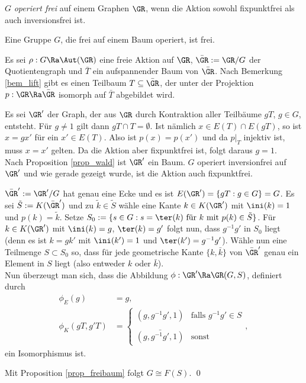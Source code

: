 \DEF $G$ \emph{operiert frei}
auf einem Graphen $\GR$, wenn die Aktion sowohl
fixpunktfrei als auch inversionsfrei ist.

\SATZ\label{satz_frei} Eine Gruppe $G$, die frei auf einem Baum
operiert, ist frei.

\bew Es sei $\rho:G\Ra\Aut(\GR)$ eine freie Aktion auf $\GR$,
$\bar{\GR}:=\GR/G$ der Quotientengraph und $\bar{T}$ ein aufspannender
Baum von $\bar{\GR}$. Nach Bemerkung \ref{bem_lift} gibt es einen
Teilbaum $T\subseteq \bar{\GR}$, der unter der Projektion
$p:\GR\Ra\bar{\GR}$ isomorph auf $\bar{T}$ abgebildet wird.

Es sei $\GR'$ der Graph, der aus $\GR$ durch Kontraktion aller
Teilbäume $gT$, $g\in G$, entsteht.
Für $g\neq 1$ gilt dann $gT\cap T=\emptyset$.
Ist nämlich $x\in E(T)\cap E(gT)$, so ist $x=gx'$ für ein
$x'\in E(T)$. Also ist $p(x)=p(x')$ und da $p|_T$ injektiv ist,
muss $x=x'$ gelten. Da die Aktion aber fixpunktfrei ist, folgt
daraus $g=1$.\\
Nach Proposition \ref{prop_wald} ist $\GR'$ ein Baum. $G$ operiert
inversionfrei auf $\GR'$ und wie gerade gezeigt wurde, ist
die Aktion auch fixpunktfrei.

$\bar{\GR}':=\GR'/G$ hat genau eine Ecke und es ist
$E(\GR')=\{gT:g \in G\}=G$.
Es sei $\tilde{S}:= K(\bar{\GR}')$ und zu $\tilde{k}\in\tilde{S}$
wähle eine Kante $k\in K(\GR')$ mit $\ini(k)=1$ und $p(k)=\tilde{k}$.
Setze
$S_0:=\{s\in G: s=\ter(k)\text{ für $k$ mit $p(k)\in\tilde{S}$}\}$.
Für $k\in K(\GR')$ mit $\ini(k)=g$, $\ter(k)=g'$ folgt nun,
dass $g^{-1}g'$ in $S_0$ liegt (denn es ist $k=gk'$ mit
$\ini(k')=1$ und $\ter(k')=g^{-1}g'$).
Wähle nun eine Teilmenge $S\subset S_0$ so, dass für jede
geometrische Kante $\{k,\bar{k}\}$ von $\bar{\GR}'$ genau
ein Element in $S$ liegt (also entweder $k$ oder $\bar{k}$).\\
Nun überzeugt man sich, dass die Abbildung
$\phi:\GR'\Ra\GR(G,S)$, definiert durch
\begin{align*}
\phi_E(g) &= g,\\
\phi_K(gT,g'T) &=
\left\{
\begin{matrix}
(g,g^{-1}g',1) & \text{falls } g^{-1}g'\in S \\
\\
\bar{(g,g^{-1}g',1)} & \text{sonst}
\end{matrix}\right.,
\end{align*}
ein Isomorphismus ist.

Mit Proposition \ref{prop_freibaum} folgt $G\cong F(S)$.
\qed